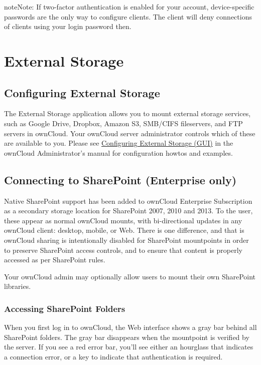 \documentclass[letterpaper,10pt,english]{sphinxmanual}
\begin{document}
\begin{notice}{note}{Note:}
If two-factor authentication is enabled for your account,
device-specific passwords are the only way to configure clients. The
client will deny connections of clients using your login password then.
\end{notice}


\chapter{External Storage}
\label{external_storage/index:external-storage}\label{external_storage/index::doc}

\section{Configuring External Storage}
\label{external_storage/external_storage::doc}\label{external_storage/external_storage:configuring-external-storage}
The External Storage application allows you to mount external storage services,
such as Google Drive, Dropbox, Amazon S3, SMB/CIFS fileservers, and FTP servers
in ownCloud. Your ownCloud server administrator controls which of these are
available to you. Please see \href{https://doc.owncloud.org/server/9.0/admin\_manual/configuration\_files/external\_storage\_configuration\_gui.html}{Configuring External Storage (GUI)} in the ownCloud Administrator's
manual for configuration howtos and examples.


\section{Connecting to SharePoint (Enterprise only)}
\label{external_storage/sharepoint_connecting:connecting-to-sharepoint-enterprise-only}\label{external_storage/sharepoint_connecting::doc}
Native SharePoint support has been added to ownCloud Enterprise Subscription as
a secondary storage location for SharePoint 2007, 2010 and 2013. To the user,
these appear as normal ownCloud mounts, with bi-directional updates in any
ownCloud client: desktop, mobile, or Web. There is one difference, and that is
ownCloud sharing is intentionally disabled for SharePoint mountpoints in order
to preserve SharePoint access controls, and to ensure that content is properly
accessed as per SharePoint rules.

Your ownCloud admin may optionally allow users to mount their own SharePoint
libraries.


\subsection{Accessing SharePoint Folders}
\label{external_storage/sharepoint_connecting:accessing-sharepoint-folders}
When you first log in to ownCloud, the Web interface shows a gray bar behind all
SharePoint folders. The gray bar disappears when the mountpoint is verified by
the server. If you see a red error bar, you'll see either an hourglass that
indicates a connection error, or a key to indicate that authentication is
required.
\end{document}
